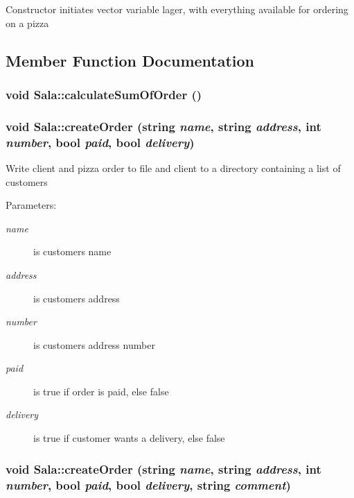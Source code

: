 Constructor initiates vector variable lager, with everything available for ordering on a pizza 

\subsection{Member Function Documentation}
\hypertarget{class_sala_24b9bb5302a251b41fed3df1fb7ce8ad}{
\subsubsection[calculateSumOfOrder]{\setlength{\rightskip}{0pt plus 5cm}void Sala::calculate\-Sum\-Of\-Order ()}}
\label{class_sala_24b9bb5302a251b41fed3df1fb7ce8ad}


\hypertarget{class_sala_9f3c48158017cdc015a985e9712f0179}{
\subsubsection[createOrder]{\setlength{\rightskip}{0pt plus 5cm}void Sala::create\-Order (string {\em name}, string {\em address}, int {\em number}, bool {\em paid}, bool {\em delivery})}}
\label{class_sala_9f3c48158017cdc015a985e9712f0179}


Write client and pizza order to file and client to a directory containing a list of customers

\begin{Desc}
\item[Parameters:]
\begin{description}
\item[{\em name}]is customers name \item[{\em address}]is customers address \item[{\em number}]is customers address number \item[{\em paid}]is true if order is paid, else false \item[{\em delivery}]is true if customer wants a delivery, else false \end{description}
\end{Desc}
\hypertarget{class_sala_554463c0b82fb266c21e23e040bf1ac0}{
\subsubsection[createOrder]{\setlength{\rightskip}{0pt plus 5cm}void Sala::create\-Order (string {\em name}, string {\em address}, int {\em number}, bool {\em paid}, bool {\em delivery}, string {\em comment})}}
\label{class_sala_554463c0b82fb266c21e23e040bf1ac0}


